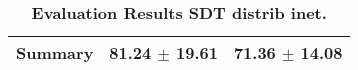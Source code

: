 \begin{table}[htb]
{\begin{tabular}{lll}
\midrule
\textbf{Summary                                  } &                  \phantom{0}81.24 $\pm$ 19.61 &                      \phantom{0}71.36 $\pm$ 14.08 \\
\bottomrule
\end{tabular}%
}
\caption{\textbf{Evaluation Results SDT distrib inet.}}
\label{tab:eval-results}
\end{table}
